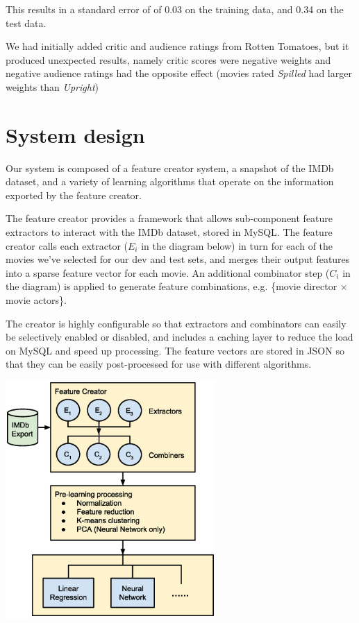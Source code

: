 \documentclass[journal]{IEEEtran}
\begin{document}
This results in a standard error of of 0.03 on the training data, and 0.34 on the test data.
\\
\par We had initially added critic and audience ratings from Rotten Tomatoes, but it produced unexpected results, namely critic scores were negative weights and negative audience ratings had the opposite effect (movies rated \emph{Spilled} had larger weights than \emph{Upright})

\section{System design}
Our system is composed of a feature creator system, a snapshot of the IMDb dataset,
and a variety of learning algorithms that operate on the information exported by
the feature creator.
\par The feature creator provides a framework that allows sub-component
feature extractors to interact with the IMDb dataset, stored in MySQL.  The feature
creator calls each extractor ($E_i$ in the diagram below) in turn for each of the movies we've selected for our
dev and test sets, and merges their output features into a sparse feature vector for
each movie.  An additional combinator step ($C_i$ in the diagram) is applied to generate feature
combinations, e.g. \{movie director $\times$ movie actors\}.
\par The creator is highly configurable so that extractors and combinators can easily be selectively enabled or disabled,
and includes a caching layer to reduce the load on MySQL and speed up processing.
The feature vectors are stored in JSON so that they can be easily
post-processed for use with different algorithms. \\

\begin{center}
    \includegraphics[width=8cm]{charts/system.eps}
\end{center}
\end{document}
